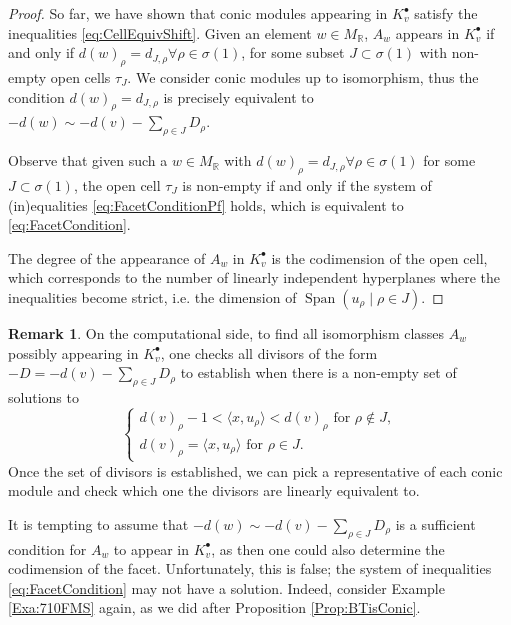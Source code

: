 \documentclass[reqno, 12pt]{amsart}
\theoremstyle{definition}
\newtheorem{remark}[theorem]{Remark}
\numberwithin{equation}{section}
\newcommand{\R}{\mathbb{R}}
\begin{document}
\begin{proof}
    So far, we have shown that conic modules appearing in $K_v^\bullet$ satisfy the inequalities \eqref{eq:CellEquivShift}. Given an element $w\in M_\R$, $A_w$ appears in $K_v^\bullet$ if and only if $d(w)_\rho=d_{J,\rho} \forall \rho\in \sigma(1)$, for some subset $J\subset \sigma(1)$ with non-empty open cells $\tau_J$. We consider conic modules up to isomorphism, thus the condition $d(w)_\rho=d_{J,\rho}$ is precisely equivalent to $-d(w)\sim-d(v)-\sum_{\rho\in J}D_\rho$.

    Observe that given such a $w\in M_\R$ with $d(w)_\rho=d_{J,\rho} \forall \rho\in \sigma(1)$ for some $J\subset \sigma(1)$, the open cell $\tau_J$ is non-empty if and only if the system of (in)equalities \eqref{eq:FacetConditionPf} holds, which is equivalent to \eqref{eq:FacetCondition}.

    The degree of the appearance of $A_w$ in $K_v^\bullet$ is the codimension of the open cell, which corresponds to the number of linearly independent hyperplanes where the inequalities become strict, i.e. the dimension of $\operatorname{Span}(u_\rho\mid \rho\in J)$. 
\end{proof}

\begin{remark}
    \label{Rem:FacetComputation}
    On the computational side, to find all isomorphism classes $A_w$ possibly appearing in $K_v^\bullet$, one checks all divisors of the form $-D=-d(v)-\sum_{\rho\in J}D_\rho$ to establish when there is a non-empty set of solutions to 
    \[
        \begin{cases} d(v)_\rho-1 <\langle x,u_\rho\rangle <d(v)_\rho \text{ for }\rho \not\in J,\\
        d(v)_\rho =\langle x,u_\rho\rangle \text{ for } \rho \in J.\end{cases}
    \]
    Once the set of divisors is established, we can pick a representative of each conic module and check which one the divisors are linearly equivalent to.
\end{remark}

It is tempting to assume that $-d(w)\sim -d(v)-\sum_{\rho\in J}D_\rho$ is a sufficient condition for $A_w$ to appear in $K_v^\bullet$, as then one could also determine the codimension of the facet.
Unfortunately, this is false; the system of inequalities \eqref{eq:FacetCondition} may not have a solution. Indeed, consider Example \ref{Exa:710FMS} again, as we did after Proposition \ref{Prop:BTisConic}.
\end{document}
